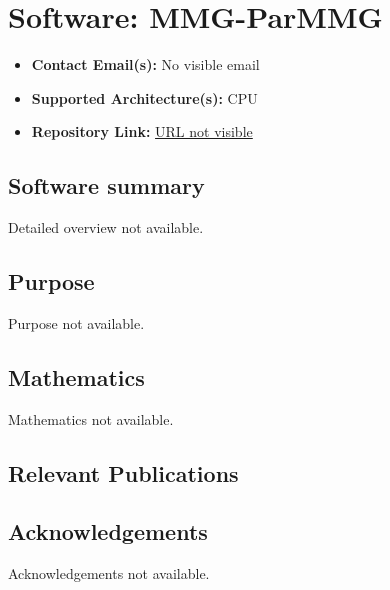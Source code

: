 \section{Software: MMG-ParMMG}
\label{sec:MMG-ParMMG:software}



\begin{itemize}
    \item \textbf{Contact Email(s):} No visible email
    \item \textbf{Supported Architecture(s):} CPU
    \item \textbf{Repository Link:} \href{URL not visible}{URL not visible}
\end{itemize}

\subsection{Software summary}
\label{sec:MMG-ParMMG:summary}
Detailed overview not available.



\subsection{Purpose}
\label{sec:MMG-ParMMG:purpose}
Purpose not available.



\subsection{Mathematics}
\label{sec:MMG-ParMMG:mathematics}
Mathematics not available.


\subsection{Relevant Publications}
\label{sec:MMG-ParMMG:publications}

\subsection{Acknowledgements}
\label{sec::MMG-ParMMG:acknowledgements}

Acknowledgements not available.


